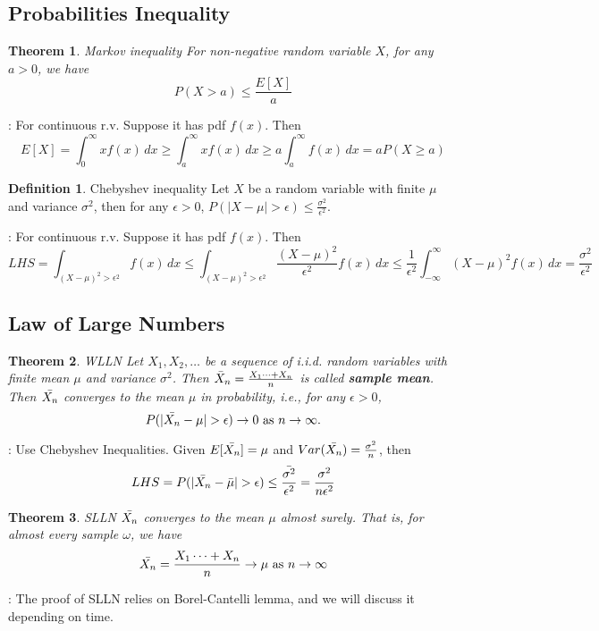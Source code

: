 \documentclass[11pt]{article}
\newtheorem{theorem}{Theorem}[section]
\theoremstyle{definition}
\newtheorem{definition}{Definition}[section]
\theoremstyle{remark}
\begin{document}
\subsection{Probabilities Inequality}
    \begin{theorem}{Markov inequality}
        For non-negative random variable $X$, for any $a > 0$, we have $$P(X>a) \leq \frac{E[X]}{a}$$
    \end{theorem}
        \proofname: For continuous r.v. Suppose it has pdf $f(x)$. Then $$E[X] = \int_{0}^{\infty} x f(x) \,dx \geq \int_{a}^{\infty} x f(x) \,dx \geq a\int_{a}^{\infty} f(x) \,dx  = a P(X\geq a)$$
    \begin{definition}{Chebyshev inequality}
        Let $X$ be a random variable with finite $\mu$ and variance $\sigma^2$, then for any $\epsilon > 0$, $P(|X-\mu| >\epsilon) \leq \frac{\sigma^2}{\epsilon^2}$.
    \end{definition}
        \proofname: For continuous r.v. Suppose it has pdf $f(x)$. Then $$LHS = \int_{(X-\mu)^2 > \epsilon^2} f(x) \,dx \leq \int_{(X-\mu)^2 > \epsilon^2} \frac{(X-\mu)^2}{\epsilon^2} f(x) \,dx \leq \frac{1}{\epsilon^2} \int_{-\infty}^{\infty} (X-\mu)^2 f(x) \,dx = \frac{\sigma^2}{\epsilon^2}$$
    
\subsection{Law of Large Numbers}
    \begin{theorem}{WLLN} Let $X_1, X_2, \dots$ be a sequence of i.i.d. random variables with finite mean $\mu$ and variance $\sigma^2$. Then $\Bar{X}_n = \frac{X_1 \dots + X_n}{n}$ is called \textbf{sample mean}.
    Then $\Bar{X_n}$ converges to the mean $\mu$ in probability, i.e., for any $\epsilon > 0$, 
    $$P(|\Bar{X_n} - \mu| > \epsilon) \rightarrow 0 \text{ as } n \rightarrow \infty.$$
    \end{theorem}
        \proofname: Use Chebyshev Inequalities.
        Given $E[\Bar{X_n}] = \mu$ and $Var(\Bar{X_n})=\frac{\sigma^2}{n}$, then $$LHS = P(|\Bar{X_n} - \Bar{\mu}| > \epsilon) \leq \frac{\Bar{\sigma^2}}{\epsilon^2} = \frac{\sigma^2}{n\epsilon^2} $$

    \begin{theorem}{SLLN}
        $\Bar{X_n}$ converges to the mean $\mu$ almost surely. That is, for almost every sample $\omega$, we have 
        $$\Bar{X_n} = \frac{X_1 \dots + X_n}{n} \rightarrow \mu \text{ as } n \rightarrow \infty$$
    \end{theorem}
        \proofname: The proof of SLLN relies on Borel-Cantelli lemma, and we will discuss it depending on time.
\end{document}
